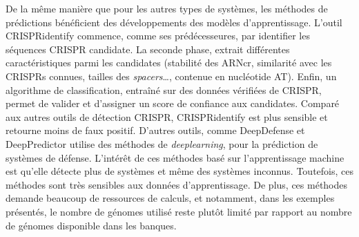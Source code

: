 De la même manière que pour les autres types de systèmes, les méthodes de prédictions bénéficient des développements des modèles d'apprentissage. L'outil CRISPRidentify\cite{mitrofanov_crispridentify_2021} commence, comme ses prédécesseures, par identifier les séquences CRISPR candidate. La seconde phase, extrait différentes caractéristiques parmi les candidates (stabilité des ARNcr, similarité avec les CRISPRs connues, tailles des \textit{spacers}\dots, contenue en nucléotide AT). Enfin, un algorithme de classification, entraîné sur des données vérifiées de CRISPR, permet de valider et d'assigner un score de confiance aux candidates. Comparé aux autres outils de détection CRISPR, CRISPRidentify est plus sensible et retourne moins de faux positif. D'autres outils, comme DeepDefense \cite{hauns_deepdefense_2024} et DeepPredictor\cite{hauns_deepdefense_2024} utilise des méthodes de \textit{deeplearning}, pour la prédiction de systèmes de défense. L'intérêt de ces méthodes basé sur l'apprentissage machine est qu'elle détecte plus de systèmes et même des systèmes inconnus. Toutefois, ces méthodes sont très sensibles aux données d'apprentissage. De plus, ces méthodes demande beaucoup de ressources de calculs, et notamment, dans les exemples présentés, le nombre de génomes utilisé reste plutôt limité par rapport au nombre de génomes disponible dans les banques.